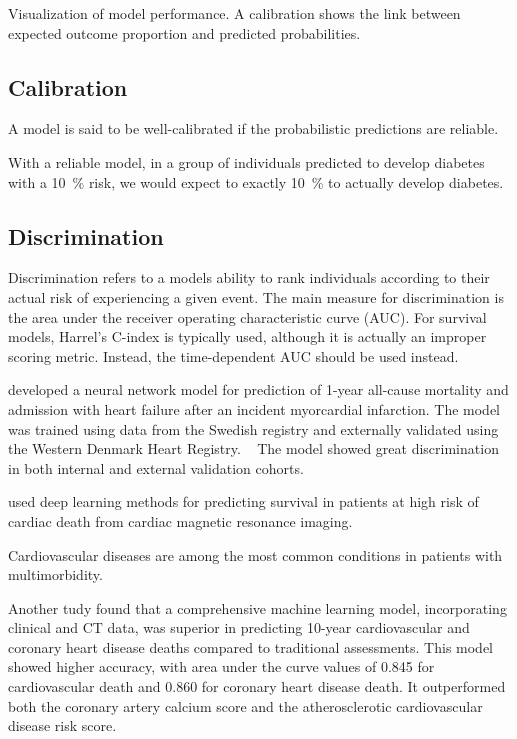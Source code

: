Visualization of model performance.
A calibration shows the link between 
expected outcome proportion 
and predicted probabilities.

\subsection{Calibration}

A model is said to be well-calibrated
if the probabilistic predictions are reliable.

With a reliable model, 
in a group of individuals predicted to develop diabetes
with a \SI{10}{\percent} risk, 
we would expect to exactly \SI{10}{\percent} to actually develop diabetes.


\subsection{Discrimination}

Discrimination refers to a models ability to rank individuals according 
to their actual risk of experiencing a given event.
The main measure for discrimination is the area under the receiver
operating characteristic curve (AUC).
For survival models, Harrel's C-index is typically used,
although it is actually an improper scoring metric.
Instead, the time-dependent AUC should be used instead.



\textcite{mohammadDevelopment2022} developed a neural network model
for prediction of 1-year all-cause mortality and admission with heart failure 
after an incident myorcardial infarction.
The model was trained using data from the Swedish 
registry and externally validated using the Western Denmark
Heart Registry.
~\autocite{mohammadDevelopment2022}
The model showed great discrimination in both internal and external
validation cohorts.




\textcite{popescuArrhythmic2022}
used deep learning methods for predicting
survival in patients at high risk of cardiac death
from cardiac magnetic resonance imaging.

Cardiovascular diseases are among the most common conditions in 
patients with multimorbidity.
~\autocite{dunlayMultimorbidity2016}



Another tudy found that a comprehensive machine learning model, incorporating
clinical and CT data, was superior in predicting 10-year cardiovascular and
coronary heart disease deaths compared to traditional assessments. This model
showed higher accuracy, with area under the curve values of 0.845 for
cardiovascular death and 0.860 for coronary heart disease death. It
outperformed both the coronary artery calcium score and the atherosclerotic
cardiovascular disease risk score.
~\autocite{nakanishiMachine2021}

